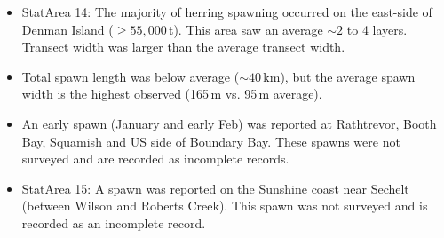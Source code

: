 \begin{itemize}
\item StatArea 14: The majority of herring spawning occurred on the east-side of Denman Island ($\geq55,000\,$t).
This area saw an average $\sim2$ to 4 layers.
Transect width was larger than the average transect width.
\item Total spawn length was below average ($\sim40$\,km), but the average spawn width is the highest observed (165\,m vs. 95\,m average).  
\item An early spawn (January and early Feb) was reported at Rathtrevor, Booth Bay, Squamish and US side of Boundary Bay. 
These spawns were not surveyed and are recorded as incomplete records.
\item StatArea 15: A spawn was reported on the Sunshine coast near Sechelt (between Wilson and Roberts Creek). This spawn was not surveyed and is recorded as an incomplete record.
\end{itemize}